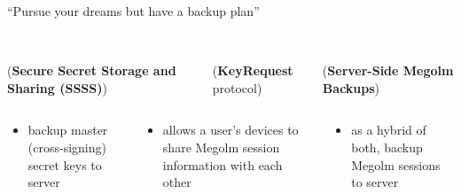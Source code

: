 \documentclass[aspectratio=169]{beamer}
\begin{document}
\begin{frame}{``Pursue your dreams but have a backup plan''}
\begin{columns}
\begin{column}{0.3\columnwidth}
{
    }
  \end{column}
\end{columns}

\vspace{1em}

\begin{columns}[t]
  \begin{column}{0.3\columnwidth}
     \\
    (\textbf{Secure Secret Storage and Sharing (SSSS)})


  \end{column}
  \begin{column}{0.4\columnwidth}
    \\
    (\textbf{KeyRequest} protocol)

  \end{column}
  \begin{column}{0.3\columnwidth}
    \\
    (\textbf{Server-Side Megolm Backups})


  \end{column}
\end{columns}

\begin{columns}[t]
  \begin{column}{0.3\columnwidth}
    \begin{itemize}
    \item backup master (cross-signing) secret keys to server
    \end{itemize}
  \end{column}
  \begin{column}{0.4\columnwidth}
    \begin{itemize}
    \item allows a user's devices to share Megolm session information with each other
    \end{itemize}

  \end{column}
  \begin{column}{0.3\columnwidth}
    \begin{itemize}
    \item as a hybrid of both, backup Megolm sessions to server
    \end{itemize}
  \end{column}
\end{columns}

\end{frame}
\end{document}
